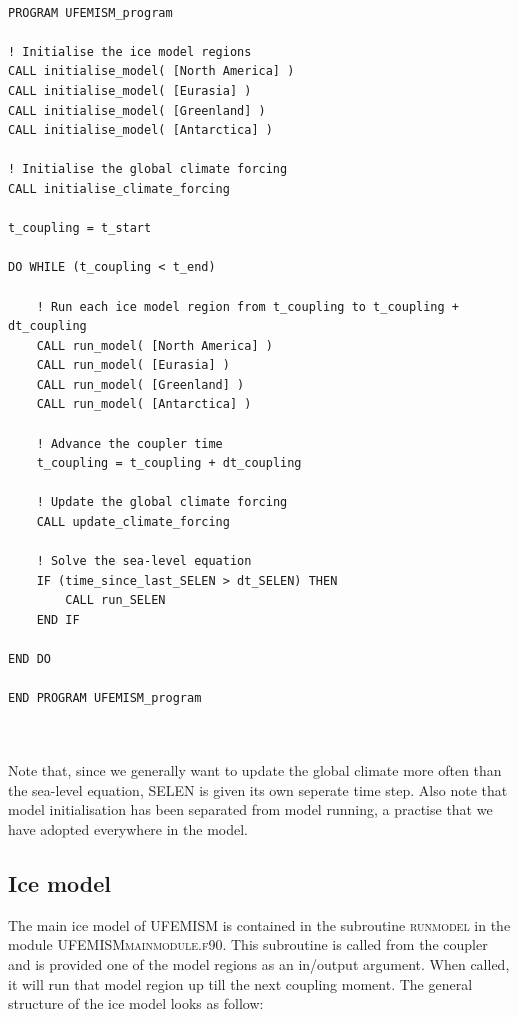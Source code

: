 \documentclass{article}
\begin{document}
\hrulefill
\begin{lstlisting}

PROGRAM UFEMISM_program

! Initialise the ice model regions
CALL initialise_model( [North America] )
CALL initialise_model( [Eurasia] )
CALL initialise_model( [Greenland] )
CALL initialise_model( [Antarctica] )

! Initialise the global climate forcing
CALL initialise_climate_forcing

t_coupling = t_start

DO WHILE (t_coupling < t_end)
	
	! Run each ice model region from t_coupling to t_coupling + dt_coupling
	CALL run_model( [North America] )
	CALL run_model( [Eurasia] )
	CALL run_model( [Greenland] )
	CALL run_model( [Antarctica] )
	
	! Advance the coupler time
	t_coupling = t_coupling + dt_coupling
	
	! Update the global climate forcing
	CALL update_climate_forcing
	
	! Solve the sea-level equation
	IF (time_since_last_SELEN > dt_SELEN) THEN
		CALL run_SELEN
	END IF
	
END DO

END PROGRAM UFEMISM_program

\end{lstlisting}
\hrulefill
\\
\\

Note that, since we generally want to update the global climate more often than the sea-level equation, SELEN is given its own seperate time step. Also note that model initialisation has been separated from model running, a practise that we have adopted everywhere in the model.

\subsection{Ice model}

The main ice model of UFEMISM is contained in the subroutine \textsc{run\textunderscore model} in the module \textsc{UFEMISM\textunderscore main\textunderscore module.f90}. This subroutine is called from the coupler and is provided one of the model regions as an in/output argument. When called, it will run that model region up till the next coupling moment. The general structure of the ice model looks as follow:
\end{document}
